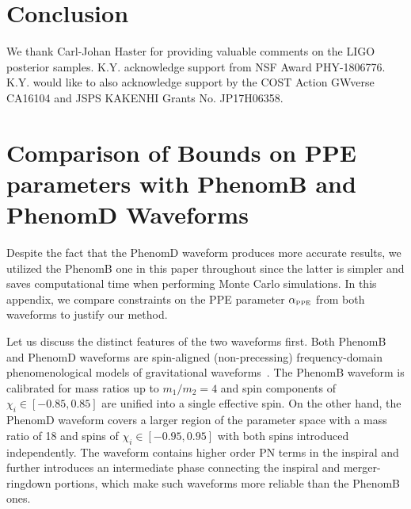 \documentclass[prd,twocolumn,nofootinbib]{revtex4-1}
\newcommand{\PPE}{{\mbox{\tiny PPE}}}
\begin{document}
\section{Conclusion}
\acknowledgments

We thank Carl-Johan Haster for providing valuable comments on the LIGO posterior samples. 
K.Y. acknowledge support from NSF Award PHY-1806776. 
K.Y. would like to also acknowledge support by the COST Action GWverse CA16104 and JSPS KAKENHI Grants No. JP17H06358.

 \appendix 
\section{Comparison of Bounds on PPE parameters with PhenomB and PhenomD Waveforms}\label{Appendix}

Despite the fact that the PhenomD waveform produces more accurate results, we utilized the PhenomB one in this paper throughout since the latter is simpler and saves computational time when performing Monte Carlo simulations. In this appendix, we compare constraints on the PPE parameter $\alpha_\PPE$ from both waveforms to justify our method. 
 
Let us discuss the distinct features of the two waveforms first. Both PhenomB and PhenomD waveforms are spin-aligned (non-precessing) frequency-domain phenomenological models of gravitational waveforms~\cite{Ajith:2009bn,Khan:2015jqa}. The PhenomB waveform is calibrated for mass ratios up to $m_1/m_2 = 4$ and spin components of $\chi_i\in[-0.85,0.85]$ are unified into a single effective spin. On the other hand, the PhenomD waveform covers a larger region of the parameter space with a mass ratio of 18 and spins of $\chi_i\in[-0.95,0.95]$ with both spins introduced independently. The waveform  contains higher order PN terms in the inspiral and further introduces an intermediate phase connecting the inspiral and merger-ringdown portions,
which make such waveforms more reliable than the PhenomB ones.
\end{document}
